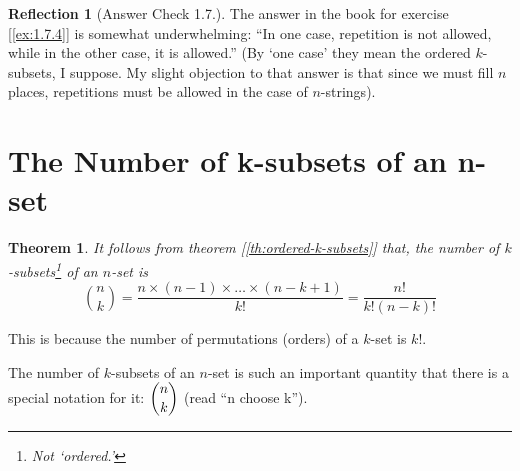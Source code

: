 \documentclass[11pt]{book}
\theoremstyle{definition}
\theoremstyle{plain}
\newtheorem{theorem}{Theorem}
\theoremstyle{definition}
\theoremstyle{problemstyle}
\theoremstyle{remark}
\theoremstyle{definition}
\newtheorem{reflection}{Reflection}
\begin{document}
\begin{reflection}[Answer Check 1.7.\textasteriskcentered]
    The answer in the book for exercise [\ref{ex:1.7.4}] is somewhat underwhelming: ``In one case, repetition is not allowed, while in the other case, it is allowed.'' (By `one case' they mean the ordered $k$-subsets, I suppose. My slight objection to that answer is that since we must fill $n$ places, repetitions must be allowed in the case of $n$-strings).
\end{reflection}
\section{The Number of k-subsets of an n-set}
\begin{theorem}
    \label{th:n-choose-k}
    It follows from theorem [\ref{th:ordered-k-subsets}] that, the number of $k$-subsets\footnote{Not `ordered.'} of an $n$-set is
    \begin{equation}
        \binom{n}{k}=\frac{n\times(n-1)\times\dots\times(n-k+1)}{k!}=\frac{n!}{k!(n-k)!}
        \label{eq:n-choose-k}
    \end{equation}
\end{theorem}
This is because the number of permutations (orders) of a $k$-set is $k!$.


The number of $k$-subsets of an $n$-set is such an important quantity that there is a special notation for it: $\dbinom{n}{k}$ (read ``n choose k'').
\end{document}
